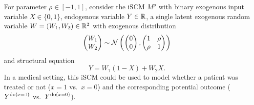 \begin{Eg}\label{ex:Counterfactuals}
  For parameter $\rho\in[-1,1]$, consider the iSCM $M^\rho$ with binary exogenous input variable $X \in \{0,1\}$, endogenous variable $Y \in \mathbb{R}$, a single latent exogenous random variable $W = (W_1,W_2) \in \mathbb{R}^2$ with
exogenous distribution 
  $$\begin{pmatrix} W_1 \\ W_2 \end{pmatrix}\sim\mathcal{N}\left(\begin{pmatrix}0 \\ 0\end{pmatrix},\begin{pmatrix}1&\rho\\ \rho&1\end{pmatrix}\right)$$
and structural equation
  $$Y = W_1 (1 - X) + W_2 X.$$
In a medical setting, this iSCM could be used to model whether a patient was treated or not ($x=1$ vs.\ $x=0$) and the corresponding potential outcome ($Y^{\operatorname{do}(x=1)}$ vs.\ $Y^{\operatorname{do}(x=0)}$).


\end{Eg}
